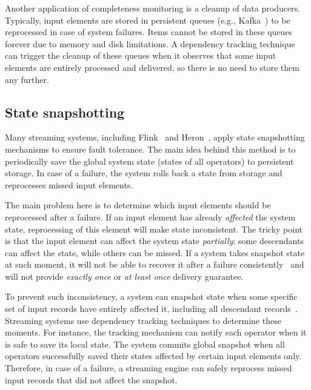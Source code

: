 Another application of completeness monitoring is a cleanup of data producers. Typically, input elements are stored in persistent queues (e.g., Kafka~\cite{kreps2011kafka}) to be reprocessed in case of system failures. Items cannot be stored in these queues forever due to memory and disk limitations. A dependency tracking technique can trigger the cleanup of these queues when it observes that some input elements are entirely processed and delivered, so there is no need to store them any further.

\subsection{State snapshotting}
Many streaming systems, including Flink~\cite{Carbone:2017:SMA:3137765.3137777} and Heron~\cite{Kulkarni:2015:THS:2723372.2742788}, apply state snapshotting mechanisms to ensure fault tolerance. The main idea behind this method is to periodically save the global system state (states of all operators) to persistent storage. In case of a failure, the system rolls back a state from storage and reprocesses missed input elements. 

The main problem here is to determine which input elements should be reprocessed after a failure. If an input element has already {\em affected} the system state, reprocessing of this element will make state inconsistent. The tricky point is that the input element can affect the system state {\em partially}: some descendants can affect the state, while others can be missed. If a system takes snapshot state at such moment, it will not be able to recover it after a failure consistently~\cite{2015arXiv150608603C} and will not provide {\em exactly once} or {\em at least once} delivery guarantee.

To prevent such inconsistency, a system can snapshot state when some specific set of input records have entirely affected it, including all descendant records~\cite{2015arXiv150608603C, thepaper}. Streaming systems use dependency tracking techniques to determine these moments. For instance, the tracking mechanism can notify each operator when it is safe to save its local state. The system commits global snapshot when all operators successfully saved their states affected by certain input elements only. Therefore, in case of a failure, a streaming engine can safely reprocess missed input records that did not affect the snapshot.

